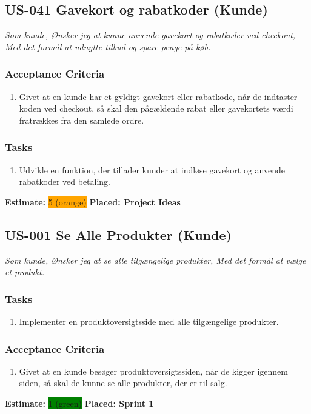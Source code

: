 \subsection{US-041 Gavekort og rabatkoder (Kunde)}
\label{sec:US-041}
\textit{Som kunde, Ønsker jeg at kunne anvende gavekort og rabatkoder ved checkout, Med det formål at udnytte tilbud og spare penge på køb.}
\subsubsection*{\textbf{Acceptance Criteria}}
\begin{enumerate}
  \item Givet at en kunde har et gyldigt gavekort eller rabatkode, når de indtaster koden ved checkout, så skal den pågældende rabat eller gavekortets værdi fratrækkes fra den samlede ordre.
\end{enumerate}
\subsubsection*{\textbf{Tasks}}
\begin{enumerate}
  \item Udvikle en funktion, der tillader kunder at indløse gavekort og anvende rabatkoder ved betaling.
\end{enumerate}
\textbf{Estimate:} \colorbox{orange}{5 (orange)}
\textbf{Placed: Project Ideas}
\par\noindent\dotfill

\subsection{US-001 Se Alle Produkter (Kunde)}
\label{sec:US-001}
\textit{Som kunde, Ønsker jeg at se alle tilgængelige produkter, Med det formål at vælge et produkt.}
\subsubsection*{\textbf{Tasks}}
\begin{enumerate}
  \item Implementer en produktoversigtsside med alle tilgængelige produkter.
\end{enumerate}
\subsubsection*{\textbf{Acceptance Criteria}}
\begin{enumerate}
  \item Givet at en kunde besøger produktoversigtssiden, når de kigger igennem siden, så skal de kunne se alle produkter, der er til salg.
\end{enumerate}
\textbf{Estimate:} \colorbox{green}{1 (green)}
\textbf{Placed: Sprint 1}
\par\noindent\dotfill

